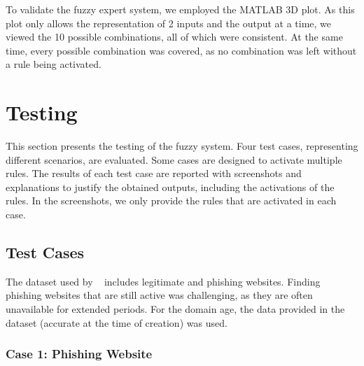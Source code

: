 \documentclass[11pt]{article}
\begin{document}
To validate the fuzzy expert system, we employed the MATLAB 3D plot. As this plot only allows the representation of 2 inputs and the output at a time, we viewed the 10 possible combinations, all of which were consistent. At the same time, every possible combination was covered, as no combination was left without a rule being activated.

\section{Testing}

This section presents the testing of the fuzzy system. Four test cases, representing different scenarios, are evaluated. Some cases are designed to activate multiple rules. The results of each test case are reported with screenshots and explanations to justify the obtained outputs, including the activations of the rules. In the screenshots, we only provide the rules that are activated in each case.

\subsection{Test Cases}

The dataset used by ~\cite{mainpaper} includes legitimate and phishing websites. Finding phishing websites that are still active was challenging, as they are often unavailable for extended periods. For the domain age, the data provided in the dataset (accurate at the time of creation) was used.

\subsubsection{Case 1: Phishing Website}
\end{document}
